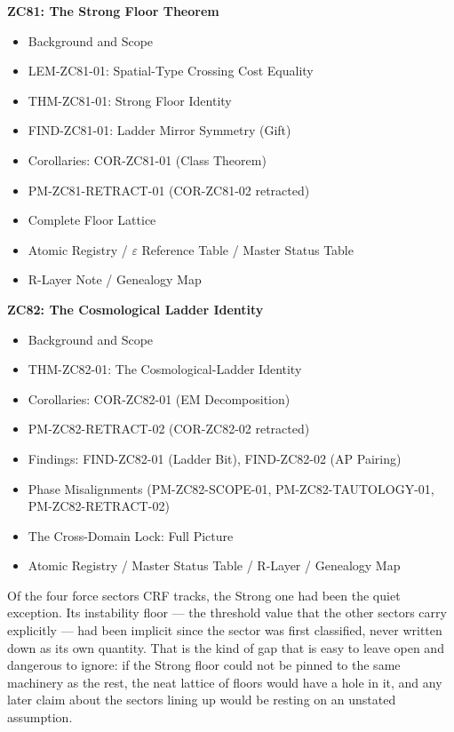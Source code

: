 \documentclass[12pt, a4paper]{article}
\begin{document}
\begin{contentsbox}[title={Part LI --- Part and Section Headers}]
\textbf{ZC81: The Strong Floor Theorem}
\begin{itemize}[noitemsep, leftmargin=1.5em]
  \item Background and Scope
  \item LEM-ZC81-01: Spatial-Type Crossing Cost Equality
  \item THM-ZC81-01: Strong Floor Identity
  \item FIND-ZC81-01: Ladder Mirror Symmetry (Gift)
  \item Corollaries: COR-ZC81-01 (Class Theorem)
  \item PM-ZC81-RETRACT-01 (COR-ZC81-02 retracted)
  \item Complete Floor Lattice
  \item Atomic Registry / $\varepsilon$ Reference Table / Master Status Table
  \item R-Layer Note / Genealogy Map
\end{itemize}

\textbf{ZC82: The Cosmological Ladder Identity}
\begin{itemize}[noitemsep, leftmargin=1.5em]
  \item Background and Scope
  \item THM-ZC82-01: The Cosmological-Ladder Identity
  \item Corollaries: COR-ZC82-01 (EM Decomposition)
  \item PM-ZC82-RETRACT-02 (COR-ZC82-02 retracted)
  \item Findings: FIND-ZC82-01 (Ladder Bit),
    FIND-ZC82-02 (AP Pairing)
  \item Phase Misalignments (PM-ZC82-SCOPE-01, PM-ZC82-TAUTOLOGY-01, PM-ZC82-RETRACT-02)
  \item The Cross-Domain Lock: Full Picture
  \item Atomic Registry / Master Status Table / R-Layer / Genealogy Map
\end{itemize}
\end{contentsbox}

\newpage

Of the four force sectors CRF tracks, the Strong one had been the quiet
exception. Its instability floor --- the threshold value that the other
sectors carry explicitly --- had been implicit since the sector was first
classified, never written down as its own quantity. That is the kind of gap
that is easy to leave open and dangerous to ignore: if the Strong floor could
not be pinned to the same machinery as the rest, the neat lattice of floors
would have a hole in it, and any later claim about the sectors lining up would
be resting on an unstated assumption.
\end{document}
